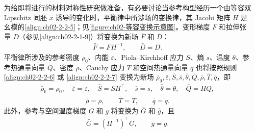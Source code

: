﻿\documentclass[../../main.tex]{subfiles}
\begin{document}
为给即将进行的材料对称性研究做准备，有必要讨论当参考构型经历一个由等容双 Lipschitz 同胚 $\bar{x}$ 诱导的变化时，平衡律中所涉场的变换律，其 Jacobi 矩阵 $H$ 是幺模的\eqref{align:ch02-2-2-5}；见\cref{figure:ch02-等容变换示意图}。变形梯度 $F$ 和拉伸张量 $D$（参见\eqref{align:ch02-2-1-9}）将变换为新场 $\bar{F}$ 和 $\bar{D}$：
\begin{align}
\bar{F}=FH^{-1},\qquad\bar{D}=D.
\label{align:ch02-2-3-19}
\end{align}
平衡律所涉及的参考密度 $\rho_{0}$、内能 $\varepsilon$、Piola--Kirchhoff 应力 $S$、熵 $s$、温度 $\theta$、参考热通量向量 $Q$、密度 $\rho$、Cauchy 应力 $T$ 和空间热通量向量 $q$ 也将按照规则\eqref{align:ch02-2-2-6} 或 \eqref{align:ch02-2-2-7} 变换为新场 $\bar{\rho}_{0},\bar{\varepsilon},\bar{S},\bar{s},\bar{\theta},\bar{Q},\bar{\rho},\bar{T},\bar{q}$，即
\begin{align}
\bar{\rho}_{0}=\rho_{0},\quad\bar{\varepsilon}=\varepsilon,\quad\bar{S}=SH^{\top},\quad\bar{s}=s,\quad\bar{\theta}=\theta,\quad\bar{Q}=HQ,
\label{align:ch02-2-3-20}
\end{align}
\begin{align}
\bar{\rho}=\rho,\qquad\bar{T}=T,\qquad\bar{q}=q.
\label{align:ch02-2-3-21}
\end{align}
此外，参考与空间温度梯度 $G$ 和 $g$ 将变换为 $\bar{G}$ 和 $\bar{g}$，且
\begin{align}
\bar{G}=(H^{-1})^{\top}G,\qquad\bar{g}=g.
\label{align:ch02-2-3-22}
\end{align}
\end{document}
